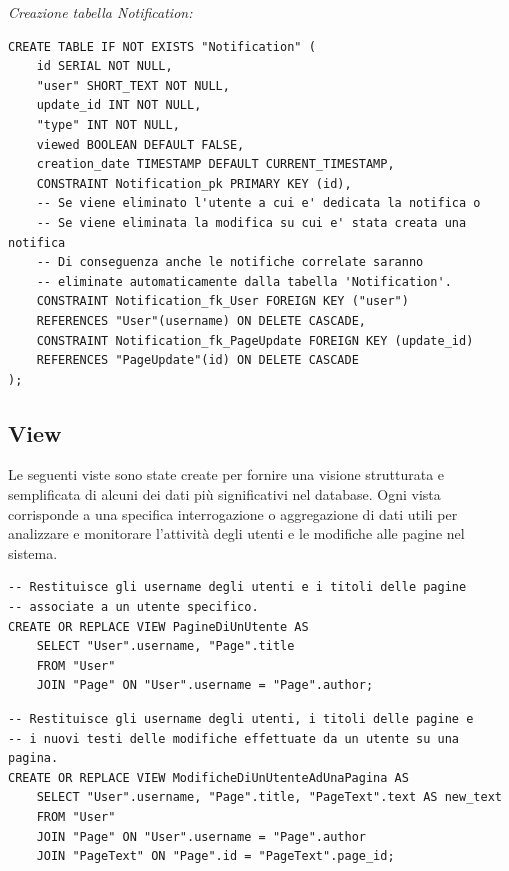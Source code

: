 \documentclass{article}
\begin{document}
	\textit{Creazione tabella Notification:}
	\begin{lstlisting}[style=SQL]
CREATE TABLE IF NOT EXISTS "Notification" (
	id SERIAL NOT NULL,
	"user" SHORT_TEXT NOT NULL,
	update_id INT NOT NULL,
	"type" INT NOT NULL,
	viewed BOOLEAN DEFAULT FALSE,
	creation_date TIMESTAMP DEFAULT CURRENT_TIMESTAMP,
	CONSTRAINT Notification_pk PRIMARY KEY (id),
	-- Se viene eliminato l'utente a cui e' dedicata la notifica o 
	-- Se viene eliminata la modifica su cui e' stata creata una notifica
	-- Di conseguenza anche le notifiche correlate saranno 
	-- eliminate automaticamente dalla tabella 'Notification'.	
	CONSTRAINT Notification_fk_User FOREIGN KEY ("user")
	REFERENCES "User"(username) ON DELETE CASCADE,
	CONSTRAINT Notification_fk_PageUpdate FOREIGN KEY (update_id) 
	REFERENCES "PageUpdate"(id) ON DELETE CASCADE
);
	\end{lstlisting}
	
	\newpage
	
	\subsection{View}
	
	Le seguenti viste sono state create per fornire una visione strutturata e semplificata di alcuni dei dati pi\`u significativi nel database. Ogni vista corrisponde a una specifica interrogazione o aggregazione di dati utili per analizzare e monitorare l'attività degli utenti e le modifiche alle pagine nel sistema.
	
\begin{lstlisting}[caption={Vista PagineDiUnUtente}, label={lst:pagine_di_un_utente}, style=SQL]
-- Restituisce gli username degli utenti e i titoli delle pagine 
-- associate a un utente specifico.
CREATE OR REPLACE VIEW PagineDiUnUtente AS
	SELECT "User".username, "Page".title
	FROM "User"
	JOIN "Page" ON "User".username = "Page".author;
\end{lstlisting}

\begin{lstlisting}[caption={Vista ModificheDiUnUtenteAdUnaPagina}, label={lst:modifiche_di_un_utente_ad_una_pagina}, style=SQL]
-- Restituisce gli username degli utenti, i titoli delle pagine e 
-- i nuovi testi delle modifiche effettuate da un utente su una pagina.
CREATE OR REPLACE VIEW ModificheDiUnUtenteAdUnaPagina AS
	SELECT "User".username, "Page".title, "PageText".text AS new_text
	FROM "User"
	JOIN "Page" ON "User".username = "Page".author
	JOIN "PageText" ON "Page".id = "PageText".page_id;
\end{lstlisting}
\end{document}
